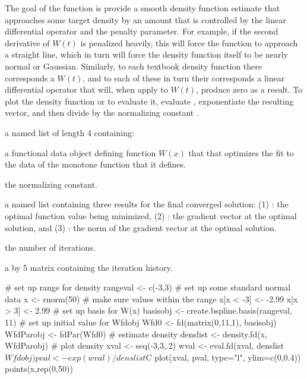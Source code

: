\documentclass{article}
\begin{document}
\begin{Details}\relax
The goal of the function is provide a smooth density function
estimate that approaches some target density by an amount that is
controlled by the linear differential operator  and
the penalty parameter. For example, if the second derivative of
$W(t)$ is penalized heavily, this will force the function to
approach a straight line, which in turn will force the density function
itself to be nearly normal or Gaussian.  Similarly, to each textbook
density function there corresponds a $W(t)$, and to each of these
in turn their corresponds a linear differential operator that will, when
apply to $W(t)$, produce zero as a result.
To plot the density function or to evaluate it, evaluate ,
exponentiate the resulting vector, and then divide by the normalizing
constant .
\end{Details}
\begin{Value}
a named list of length 4 containing:

\begin{ldescription}
\item[\code{Wfdobj}] a functional data object defining function $W(x)$ that that
optimizes the fit to the data of the monotone function that it defines.

\item[\code{C}] the normalizing constant.

\item[\code{Flist}] a named list containing three results for the final converged solution:
(1)
: the optimal function value being minimized,
(2)
: the gradient vector at the optimal solution,   and
(3)
: the norm of the gradient vector at the optimal solution.

\item[\code{iternum}] the number of iterations.

\item[\code{iterhist}] a  by 5 matrix containing the iteration
history.

\end{ldescription}
\end{Value}
\begin{SeeAlso}\relax
{}
\end{SeeAlso}
\begin{Examples}
\begin{ExampleCode}

#  set up range for density
rangeval <- c(-3,3)
#  set up some standard normal data
x <- rnorm(50)
#  make sure values within the range
x[x < -3] <- -2.99
x[x >  3] <-  2.99
#  set up basis for W(x)
basisobj <- create.bspline.basis(rangeval, 11)
#  set up initial value for Wfdobj
Wfd0 <- fd(matrix(0,11,1), basisobj)
WfdParobj <- fdPar(Wfd0)
#  estimate density
denslist <- density.fd(x, WfdParobj)
#  plot density
xval <- seq(-3,3,.2)
wval <- eval.fd(xval, denslist$Wfdobj)
pval <- exp(wval)/denslist$C
plot(xval, pval, type="l", ylim=c(0,0.4))
points(x,rep(0,50))

\end{ExampleCode}
\end{Examples}
\end{document}

